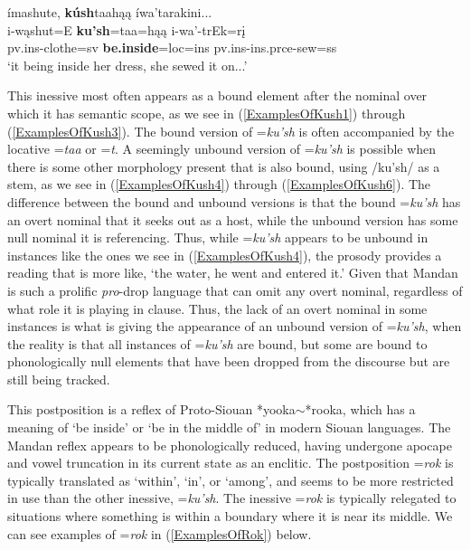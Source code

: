 \begin{exe}
\begin{xlist}
\item\label{ExamplesOfKush6} \glll ímashute, \textbf{kúsh}taahąą íwa'tarakini...\\
    i-wąshut=E \textbf{ku'sh}=taa=hąą i-wa'-trEk=rį\\
    pv.ins-\textnormal{clothe}=sv \textbf{\textnormal{\bfseries be.inside}}=loc=ins pv.ins-ins.prce-\textnormal{sew}=ss\\
    \glt `it being inside her dress, she sewed it on...' \citep[106]{hollow1973a}
\end{xlist}
\end{exe}

This inessive most often appears as a bound element after the nominal over which it has semantic scope, as we see in (\ref{ExamplesOfKush1}) through (\ref{ExamplesOfKush3}). The bound version of =\textit{ku'sh} is often accompanied by the locative =\textit{taa} or =\textit{t}. A seemingly unbound version of =\textit{ku'sh} is possible when there is some other morphology present that is also bound, using /ku'sh/ as a stem, as we see in (\ref{ExamplesOfKush4}) through (\ref{ExamplesOfKush6}). The difference between the bound and unbound versions is that the bound =\textit{ku'sh} has an overt nominal that it seeks out as a host, while the unbound version has some null nominal it is referencing. Thus, while =\textit{ku'sh} appears to be unbound in instances like the ones we see in (\ref{ExamplesOfKush4}), the prosody provides a reading that is more like, `the water, he went and entered it.' Given that Mandan is such a prolific \textit{pro}-drop language that can omit any overt nominal, regardless of what role it is playing in clause. Thus, the lack of an overt nominal in some instances is what is giving the appearance of an unbound version of =\textit{ku'sh}, when the reality is that all instances of =\textit{ku'sh} are bound, but some are bound to phonologically null elements that have been dropped from the discourse but are still being tracked.


This postposition is a reflex of Proto-Siouan *yooka$\sim$*rooka, which has a meaning of `be inside' or `be in the middle of' in modern Siouan languages. The Mandan reflex appears to be phonologically reduced, having undergone apocape and vowel truncation in its current state as an enclitic. The postposition =\textit{rok} is typically translated as `within', `in', or `among', and seems to be more restricted in use than the other inessive, =\textit{ku'sh}. The inessive =\textit{rok} is typically relegated to situations where something is within a boundary where it is near its middle. We can see examples of =\textit{rok} in (\ref{ExamplesOfRok}) below.

